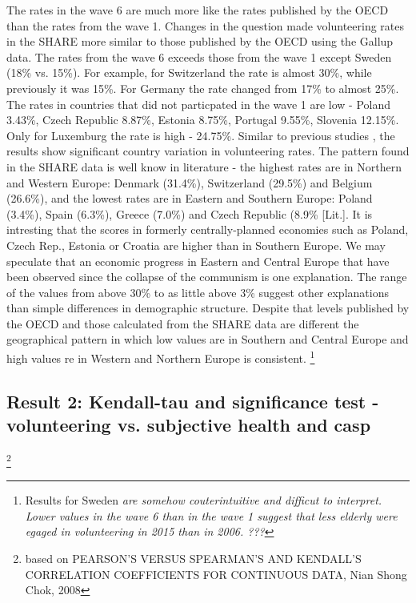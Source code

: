 \documentclass[10pt, letterpaper]{article}
\begin{document}
\begin{spacing}{1.4}
The rates in the wave 6 are much more like the rates published by the OECD than the rates from the wave 1. Changes in the question made volunteering rates in the SHARE more similar to those published by the OECD using the Gallup data. The rates from the wave 6 exceeds those from the wave 1 except Sweden (18\% vs. 15\%).  For example, for Switzerland the rate is almost 30\%, while previously it was 15\%. For Germany the rate changed from 17\% to almost 25\%. The rates in countries that did not particpated in the wave 1 are low - Poland 3.43\%, Czech Republic 8.87\%, Estonia 8.75\%, Portugal 9.55\%, Slovenia 12.15\%. Only for Luxemburg the rate is high - 24.75\%. Similar to previous studies , the results show significant country variation in volunteering rates. The pattern found in the SHARE data is well know in literature - the highest rates are in Northern and Western Europe:  Denmark (31.4\%), Switzerland (29.5\%) and Belgium (26.6\%), and the lowest rates are in Eastern and Southern Europe: Poland (3.4\%), Spain (6.3\%), Greece (7.0\%) and Czech Republic (8.9\% [Lit.]. It is intresting that the scores in formerly centrally-planned economies such as Poland, Czech Rep., Estonia or Croatia are higher than in Southern Europe. We may speculate that an economic progress in Eastern and Central Europe that have been observed since the collapse of the communism is  one explanation. The range of the values from above 30\% to as little above 3\% suggest other explanations than simple differences in demographic structure.   Despite that levels published by the OECD and those calculated from the SHARE data are different the geographical pattern in which low values are in Southern and Central Europe and high values re in  Western and Northern Europe is consistent. \footnote{Results for Sweden \textit{are somehow couterintuitive and difficut to interpret. Lower values in the wave 6 than in the wave 1 suggest that less elderly were egaged in volunteering in 2015 than in 2006. ??? }} \\



\subsection{Result 2: Kendall-tau and significance test - volunteering vs. subjective health and casp}

\footnote{based on PEARSON'S VERSUS SPEARMAN'S AND KENDALL'S CORRELATION COEFFICIENTS FOR CONTINUOUS DATA, Nian Shong Chok, 2008}


\end{spacing}
\end{document}
